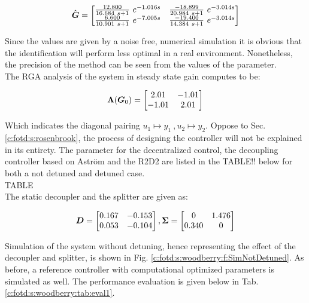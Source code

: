\begin{align*}
\hat{\mbox{\boldmath$G$}} = \begin{bmatrix}
\frac{12.800}{16.684 ~s+1}~e^{-1.016s}  & \frac{-18.899}{20.984 ~s+1}~e^{-3.014s}\\
\frac{6.600}{10.901 ~s+1}~e^{-7.005s} & \frac{-19.400}{14.384 ~s+1}~e^{-3.014s}
\end{bmatrix}
\end{align*} 

Since the values are given by a noise free, numerical simulation it is obvious that the identification will perform less optimal in a real environment. Nonetheless, the precision of the method can be seen from the values of the parameter.\\

The RGA analysis of the system in steady state gain computes to be:

\begin{align*}
\mbox{\boldmath$\Lambda$}(\mbox{\boldmath$G$}_0) = \begin{bmatrix}
2.01 & -1.01 \\
-1.01 & 2.01
\end{bmatrix}
\end{align*} 

Which indicates the diagonal pairing $u_1 \mapsto y_1~, u_2 \mapsto y_2$. Oppose to Sec.\ref{c:fotd:s:rosenbrook}, the process of designing the controller will not be explained in its entirety. The parameter for the decentralized control, the decoupling controller based on Astr\"om and the R2D2 are listed in the TABLE!! below for both a not detuned and detuned case.\\

TABLE\\

The static decoupler and the splitter are given as:

\begin{align*}
\mbox{\boldmath$D$} = \begin{bmatrix}
0.167 & -0.153 \\
0.053 & -0.104
\end{bmatrix}, \mbox{\boldmath$\Sigma$} = \begin{bmatrix}
0 & 1.476 \\
0.340 & 0
\end{bmatrix}
\end{align*}

Simulation of the system without detuning, hence representing the effect of the decoupler and splitter, is shown in Fig. \ref{c:fotd:s:woodberry:f:SimNotDetuned}. As before, a reference controller \cite{Astrom2001a} with computational optimized parameters is simulated as well. The performance evaluation is given below in Tab. \ref{c:fotd:s:woodberry:tab:eval1}.


